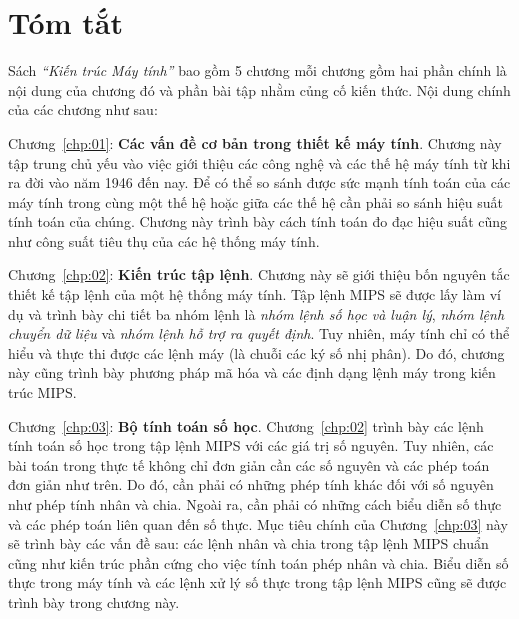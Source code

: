 \chapter{Tóm tắt}

Sách \emph{``Kiến trúc Máy tính''} bao gồm 5 chương mỗi chương gồm hai phần chính là nội dung của chương đó và phần bài tập nhằm củng cố kiến thức. Nội dung chính của các chương như sau:

Chương~\ref{chp:01}: \textbf{Các vấn đề cơ bản trong thiết kế máy tính}. Chương này tập trung chủ yếu vào việc giới thiệu các công nghệ và các thế hệ máy tính từ khi ra đời vào năm 1946 đến nay. Để có thể so sánh được sức mạnh tính toán của các máy tính trong cùng một thế hệ hoặc giữa các thế hệ cần phải so sánh hiệu suất tính toán của chúng. Chương này trình bày cách tính toán đo đạc hiệu suất cũng như công suất tiêu thụ của các hệ thống máy tính.

Chương~\ref{chp:02}: \textbf{Kiến trúc tập lệnh}. Chương này sẽ giới thiệu bốn nguyên tắc thiết kế tập lệnh của một hệ thống máy tính. Tập lệnh MIPS sẽ được lấy làm ví dụ và trình bày chi tiết ba nhóm lệnh là \emph{nhóm lệnh số học và luận lý}, \emph{nhóm lệnh chuyển dữ liệu} và \emph{nhóm lệnh hỗ trợ ra quyết định}. Tuy nhiên, máy tính chỉ có thể hiểu và thực thi được các lệnh máy (là chuỗi các ký số nhị phân). Do đó, chương này cũng trình bày phương pháp mã hóa và các định dạng lệnh máy trong kiến trúc MIPS.

Chương~\ref{chp:03}: \textbf{Bộ tính toán số học}. Chương~\ref{chp:02} trình bày các lệnh tính toán số học trong tập lệnh MIPS với các giá trị số nguyên. Tuy nhiên, các bài toán trong thực tế không chỉ đơn giản cần các số nguyên và các phép toán đơn giản như trên. Do đó, cần phải có những phép tính khác đối với số nguyên như phép tính nhân và chia. Ngoài ra, cần phải có những cách biểu diễn số thực và các phép toán liên quan đến số thực. Mục tiêu chính của Chương~\ref{chp:03} này sẽ trình bày các vấn đề sau: các lệnh nhân và chia trong tập lệnh MIPS chuẩn cũng như kiến trúc phần cứng cho việc tính toán phép nhân và chia. Biểu diễn số thực trong máy tính và các lệnh xử lý số thực trong tập lệnh MIPS cũng sẽ được trình bày trong chương này.

